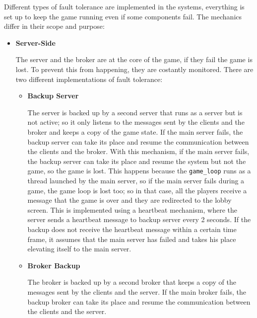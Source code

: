\documentclass{scrartcl}
\begin{document}
Different types of fault tolerance are implemented in the systems, everything is set up to keep
the game running even if some components fail. \newline
The mechanics differ in their scope and purpose:
\begin{itemize}
  \item
  \textbf{Server-Side} \par
  The server and the broker are at the core of the game, if they fail the game is lost. \newline
  To prevent this from happening, they are costantly monitored.
  There are two different implementations of fault tolerance:
  \begin{itemize}
    \item \textbf{Backup Server} \par
    The server is backed up by a second server that runs as a server but is not active; so it only listens to the messages sent by the clients and the broker and keeps a copy of the game state. \newline
    If the main server fails, the backup server can take its place and resume the communication between the clients and the broker. With this mechanism, if the main server fails, the backup server can take its place and resume the system but not the game, so the game is lost.
    This happens because the \texttt{game\_loop} runs as a thread launched by the main server, so if the main server fails during a game, the game loop is lost too; so in that case, all the players receive a message that the game is over and they are redirected to the lobby screen. \newline
    This is implemented using a heartbeat mechanism, where the server sends a heartbeat message to backup server every 2 seconds. If the backup does not receive the heartbeat message within a certain time frame, it assumes that the main server has failed and takes his place elevating itself to the main server. \newline
    \item \textbf{Broker Backup} \par
    The broker is backed up by a second broker that keeps a copy of the messages sent by the clients and the server. 
    If the main broker fails, the backup broker can take its place and resume the communication between the clients and the server.

\end{itemize}
\end{itemize}
\end{document}
